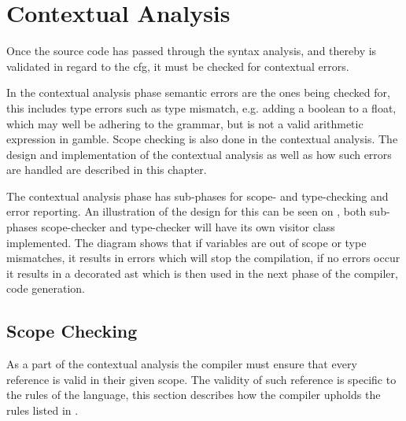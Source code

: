 \chapter{Contextual Analysis}
Once the source code has passed through the syntax analysis, and thereby is validated in regard to the \acrshort{cfg}, it must be checked for contextual errors.

In the contextual analysis phase semantic errors are the ones being checked for, this includes type errors such as type mismatch, e.g. adding a boolean to a float, which may well be adhering to the grammar, but is not a valid arithmetic expression in \gls{gamble}.
Scope checking is also done in the contextual analysis. 
The design and implementation of the contextual analysis as well as how such errors are handled are described in this chapter.

The contextual analysis phase has sub-phases for scope- and type-checking and error reporting.
An illustration of the design for this can be seen on , both sub-phases scope-checker and type-checker will have its own visitor class implemented.
The diagram shows that if variables are out of scope or type mismatches, it results in errors which will stop the compilation, if no errors occur it results in a decorated \acrshort{ast} which is then used in the next phase of the compiler, code generation.




%


\section{Scope Checking}
As a part of the contextual analysis the compiler must ensure that every reference is valid in their given scope.
The validity of such reference is specific to the rules of the language, this section describes how the compiler upholds the rules listed in .


